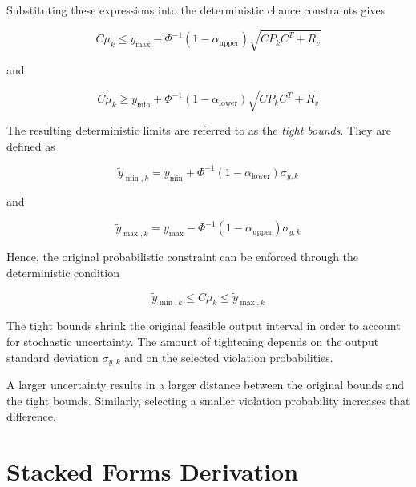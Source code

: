 Substituting these expressions into the deterministic chance constraints gives

\begin{equation}
    C\mu_k
    \leq
    y_{\max}
    -
    \Phi^{-1}
    \left(
        1-\alpha_{\mathrm{upper}}
    \right)
    \sqrt{
        CP_kC^T+R_v
    }
    \label{eq:upper_tightened}
\end{equation}

and

\begin{equation}
    C\mu_k
    \geq
    y_{\min}
    +
    \Phi^{-1}
    \left(
        1-\alpha_{\mathrm{lower}}
    \right)
    \sqrt{
        CP_kC^T+R_v
    }
    \label{eq:lower_tightened}
\end{equation}

The resulting deterministic limits are referred to as the \emph{tight bounds}. They are defined as

\begin{equation}
    \boxed{
    \tilde{y}_{\min,k}
    =
    y_{\min}
    +
    \Phi^{-1}
    \left(
        1-\alpha_{\mathrm{lower}}
    \right)
    \sigma_{y,k}
    }
    \label{eq:tight_lower_bound}
\end{equation}

and

\begin{equation}
    \boxed{
    \tilde{y}_{\max,k}
    =
    y_{\max}
    -
    \Phi^{-1}
    \left(
        1-\alpha_{\mathrm{upper}}
    \right)
    \sigma_{y,k}
    }
    \label{eq:tight_upper_bound}
\end{equation}

Hence, the original probabilistic constraint can be enforced through the deterministic condition

\begin{equation}
    \boxed{
    \tilde{y}_{\min,k}
    \leq
    C\mu_k
    \leq
    \tilde{y}_{\max,k}
    }
    \label{eq:tight_bounds}
\end{equation}

The tight bounds shrink the original feasible output interval in order to account for stochastic uncertainty. The amount of tightening depends on the output standard deviation \(\sigma_{y,k}\) and on the selected violation probabilities.

A larger uncertainty results in a larger distance between the original bounds and the tight bounds. Similarly, selecting a smaller violation probability increases that difference.
\section{Stacked Forms Derivation}
\label{sec:stochastic_stacked}

